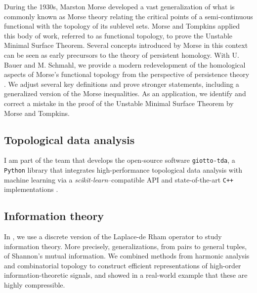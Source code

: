 During the 1930s, Marston Morse developed a vast generalization of what is commonly known as Morse theory relating the critical points of a semi-continuous functional with the topology of its sublevel sets.
Morse and Tompkins applied this body of work, referred to as functional topology, to prove the Unstable Minimal Surface Theorem.
Several concepts introduced by Morse in this context can be seen as early precursors to the theory of persistent homology.
With U. Bauer and M. Schmahl, we provide a modern redevelopment of the homological aspects of Morse's functional topology from the perspective of persistence theory \cite{medina2021functional}.
We adjust several key definitions and prove stronger statements, including a generalized version of the Morse inequalities.
As an application, we identify and correct a mistake in the proof of the Unstable Minimal Surface Theorem by Morse and Tompkins.

\subsection{Topological data analysis} \label{ss:giotto}

I am part of the team that develops the open-source software \texttt{giotto-tda}, a \texttt{Python} library that integrates high-performance topological data analysis with machine learning via a \emph{scikit-learn}--compatible API and state-of-the-art \texttt{C++} implementations \cite{medina2021giotto}.

\subsection{Information theory}

In \cite{medina2021hyperharmonic}, we use a discrete version of the Laplace-de Rham operator to study information theory.
More precisely, generalizations, from pairs to general tuples, of Shannon's mutual information.
We combined methods from harmonic analysis and combinatorial topology to construct efficient representations of high-order information-theoretic signals, and showed in a real-world example that these are highly compressible.